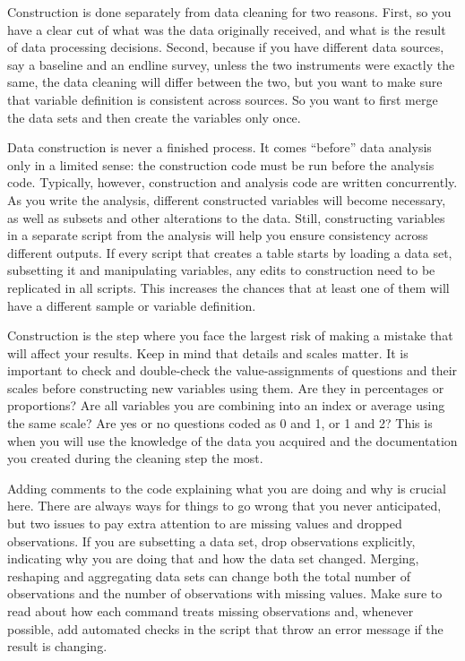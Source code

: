 
Construction is done separately from data cleaning for two reasons. 
First, so you have a clear cut of what was the data originally received,
and what is the result of data processing decisions.
Second, because if you have different data sources, 
say a baseline and an endline survey, 
unless the two instruments were exactly the same, 
the data cleaning will differ between the two,
but you want to make sure that variable definition is consistent across sources. 
So you want to first merge the data sets and then create the variables only once.

Data construction is never a finished process.
It comes ``before'' data analysis only in a limited sense: the construction code must be run before the analysis code.
Typically, however, construction and analysis code are written concurrently.
As you write the analysis, different constructed variables will become necessary, as well as subsets and other alterations to the data.
Still, constructing variables in a separate script from the analysis will help you ensure consistency across different outputs. 
If every script that creates a table starts by loading a data set, subsetting it and manipulating variables, any edits to construction need to be replicated in all scripts. 
This increases the chances that at least one of them will have a different sample or variable definition.


Construction is the step where you face the largest risk of making a mistake that will affect your results. 
Keep in mind that details and scales matter. 
It is important to check and double-check the value-assignments of questions and their scales before constructing new variables using them. 
Are they in percentages or proportions? 
Are all variables you are combining into an index or average using the same scale? 
Are yes or no questions coded as 0 and 1, or 1 and 2?
This is when you will use the knowledge of the data you acquired and the documentation you created during the cleaning step the most.

Adding comments to the code explaining what you are doing and why is crucial here.
There are always ways for things to go wrong that you never anticipated, but two issues to pay extra attention to are missing values and dropped observations. 
If you are subsetting a data set, drop observations explicitly, indicating why you are doing that and how the data set changed.
Merging, reshaping and aggregating data sets can change both the total number of observations and the number of observations with missing values.
Make sure to read about how each command treats missing observations and, whenever possible, add automated checks in the script that throw an error message if the result is changing.

